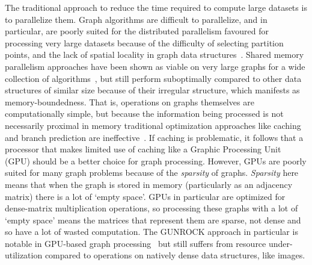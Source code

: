 \par{
    The traditional approach to reduce the time required to compute large datasets is to parallelize them. 
    Graph algorithms are difficult to parallelize, and in particular, are poorly suited for the distributed parallelism favoured for processing very large datasets because of the difficulty of selecting partition points, and the lack of spatial locality in graph data structures~\cite{Beamer2015}.
    Shared memory parallelism approaches have been shown as viable on very large graphs for a wide collection of algorithms~\cite{Dhulipala2021}, but still perform suboptimally compared to other data structures of similar size because of their irregular structure, which manifests as memory-boundedness.
    That is, operations on graphs themselves are computationally simple, but because the information being processed is not necessarily proximal in memory traditional optimization approaches like caching and branch prediction are ineffective~\cite{Aananthakrishnan2020}.
    If caching is problematic, it follows that a processor that makes limited use of caching like a Graphic Processing Unit (GPU) should be a better choice for graph processing. 
    However, GPUs are poorly suited for many graph problems because of the \textit{sparsity} of graphs.
        \textit{Sparsity} here means that when the graph is stored in memory (particularly as an adjacency matrix) there is a lot of `empty space'. 
    GPUs in particular are optimized for dense-matrix multiplication operations, so processing these graphs with a lot of `empty space' means the matrices that represent them are sparse, not dense and so have a lot of wasted computation.
    The GUNROCK approach in particular is notable in GPU-based graph processing~\cite{Wang2016} but still suffers from resource under-utilization compared to operations on natively dense data structures, like images.} 
